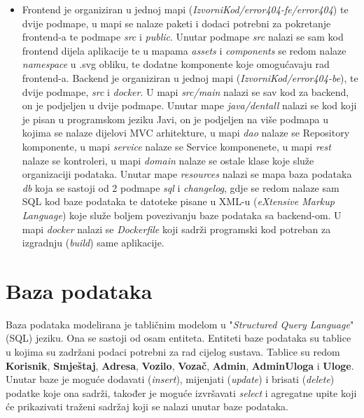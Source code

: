 \begin{itemize}
		\item 
		Frontend je organiziran u jednoj mapi (\textit{IzvorniKod/error404-fe/error404}) te dvije podmape, u mapi se nalaze paketi i dodaci potrebni za pokretanje frontend-a te podmape \textit{src} i \textit{public}. Unutar podmape \textit{src} nalazi se sam kod frontend dijela aplikacije te u mapama \textit{assets} i \textit{components} se redom nalaze \textit{namespace} u .svg obliku, te dodatne komponente koje omogućavaju rad frontend-a. \newline Backend je organiziran u jednoj mapi (\textit{IzvorniKod/error404-be}), te dvije podmape, \textit{src} i \textit{docker}. U mapi \textit{src/main} nalazi se sav kod za backend, on je podjeljen u dvije podmape. Unutar mape \textit{java/dentall} nalazi se kod koji je pisan u programskom jeziku Javi, on je podjeljen na više podmapa u kojima se nalaze dijelovi MVC arhitekture, u mapi \textit{dao} nalaze se Repository komponente, u mapi \textit{service} nalaze se Service komponenete, u mapi \textit{rest} nalaze se kontroleri, u mapi \textit{domain} nalaze se ostale klase koje služe organizaciji podataka. Unutar mape \textit{resources} nalazi se mapa baza podataka \textit{db} koja se sastoji od 2 podmape \textit{sql} i \textit{changelog}, gdje se redom nalaze sam SQL kod baze podataka te datoteke pisane u XML-u (\textit{eXtensive Markup Language}) koje služe boljem povezivanju baze podataka sa backend-om. U mapi \textit{docker} nalazi se \textit{Dockerfile} koji sadrži programski kod potreban za izgradnju (\textit{build}) same aplikacije.
		
		
	\end{itemize}
		\section{Baza podataka}
			
			
		
		{Baza podataka modelirana je tabličnim modelom u "\textit{Structured Query Language}" (SQL) jeziku. Ona se sastoji od osam entiteta. Entiteti baze podataka su tablice u kojima su zadržani podaci potrebni za rad cijelog sustava. Tablice su redom \textbf{Korisnik}, \textbf{Smještaj}, \textbf{Adresa}, \textbf{Vozilo}, \textbf{Vozač}, \textbf{Admin}, \textbf{AdminUloga} i \textbf{Uloge}. Unutar baze je moguće dodavati (\textit{insert}), mijenjati (\textit{update}) i brisati (\textit{delete}) podatke koje ona sadrži, također je moguće izvršavati \textit{select} i agregatne upite koji će prikazivati traženi sadržaj koji se nalazi unutar baze podataka.}
		
